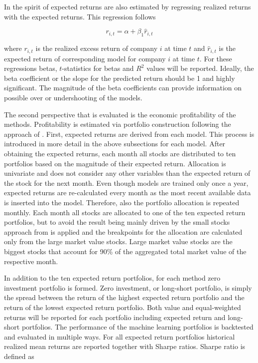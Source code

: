 \documentclass[12pt]{article}
\begin{document}
In the spirit of \citet{Lewellen2015} expected returns are also estimated by regressing realized returns with the expected returns. This regression follows \par

\begin{equation}
\label{eq:realizedRegression}
r_{i, t} = \alpha + \beta_1 \hat r_{i, t}
\end{equation}

where $r_{i, t}$ is the realized excess return of company $i$ at time $t$ and $\hat r_{i, t}$ is the expected return of corresponding model for company $i$ at time $t$.\footnotemark {} For these regressions betas, $t$-statistics for betas and $R^2$ values will be reported. Ideally, the beta coefficient or the slope for the predicted return should be 1 and highly significant. The magnitude of the beta coefficients can provide information on possible over or undershooting of the models. \par

The second perspective that is evaluated is the economic profitability of the methods. Profitability is estimated via portfolio construction following the approach of \citet{Lewellen2015}.\footnotemark {} First, expected returns are derived from each model. This process is introduced in more detail in the above subsections for each model. After obtaining the expected returns, each month all stocks are distributed to ten portfolios based on the magnitude of their expected return. Allocation is univariate and does not consider any other variables than the expected return of the stock for the next month. Even though models are trained only once a year, expected returns are re-calculated every month as the most recent available data is inserted into the model. Therefore, also the portfolio allocation is repeated monthly. Each month all stocks are allocated to one of the ten expected return portfolios, but to avoid the result being mainly driven by the small stocks approach from \citet{HANAUER2023} is applied and the breakpoints for the allocation are calculated only from the large market value stocks. Large market value stocks are the biggest stocks that account for 90\% of the aggregated total market value of the respective month.\footnotemark {} \par

In addition to the ten expected return portfolios, for each method zero investment portfolio is formed. Zero investment, or long-short portfolio, is simply the spread between the return of the highest expected return portfolio and the return of the lowest expected return portfolio. Both value and equal-weighted returns will be reported for each portfolio including expected return and long-short portfolios. The performance of the machine learning portfolios is backtested and evaluated in multiple ways. For all expected return portfolios historical realized mean returns are reported together with Sharpe ratios. Sharpe ratio is defined as
\end{document}
